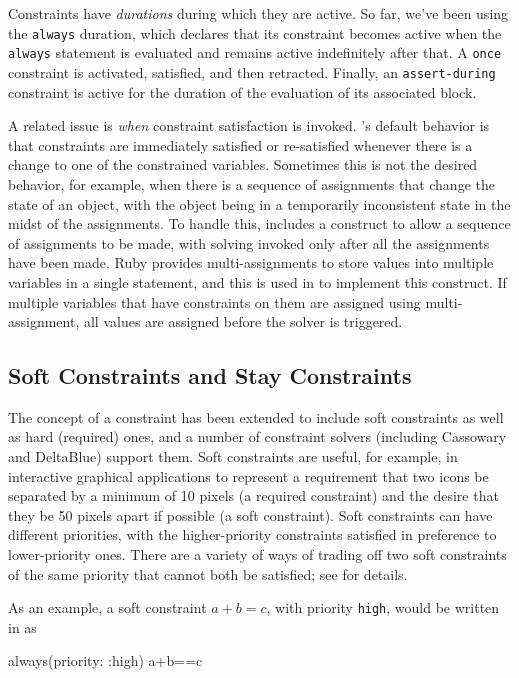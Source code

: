 Constraints have \emph{durations} during which they are active.  So
far, we've been using the \lstinline{always} duration, which declares
that its constraint becomes active when the \lstinline{always}
statement is evaluated and remains active indefinitely after that. A
\lstinline{once} constraint is activated, satisfied, and then
retracted.  Finally, an \lstinline{assert-during} constraint is active
for the duration of the evaluation of its associated block.

A related issue is \emph{when} constraint satisfaction is invoked.
\langname's default behavior is that constraints are immediately
satisfied or re-satisfied whenever there is a change to one of the
constrained variables.  Sometimes this is not the desired behavior,
for example, when there is a sequence of assignments that change the
state of an object, with the object being in a temporarily
inconsistent state in the midst of the assignments.  To handle this,
\langname includes a construct to allow a sequence of assignments to
be made, with solving invoked only after all the assignments have been
made.  Ruby provides multi-assignments to store values into multiple
variables in a single statement, and this is used in \toolname to
implement this construct.  If multiple variables that have constraints
on them are assigned using multi-assignment, all values are assigned
before the solver is triggered.

\subsection{Soft Constraints and Stay Constraints}
\label{sec:soft-constraints}

The concept of a constraint has been extended to include soft
constraints as well as hard (required) ones, and a number of
constraint solvers (including Cassowary and DeltaBlue) support them.
Soft constraints are useful, for example, in interactive graphical
applications to represent a requirement that two icons be separated by
a minimum of 10 pixels (a required constraint) and the desire that
they be 50 pixels apart if possible (a soft constraint).  Soft
constraints can have different priorities, with the higher-priority
constraints satisfied in preference to lower-priority ones.  There are
a variety of ways of trading off two soft constraints of the same
priority that cannot both be satisfied; see
\cite{borning-lisp-symbolic-computation-1992} for details.

As an example, a soft constraint $a+b=c$, with priority
\lstinline{high}, would be written in \toolname as
\begin{code}
always(priority: :high) {a+b==c}
\end{code}

